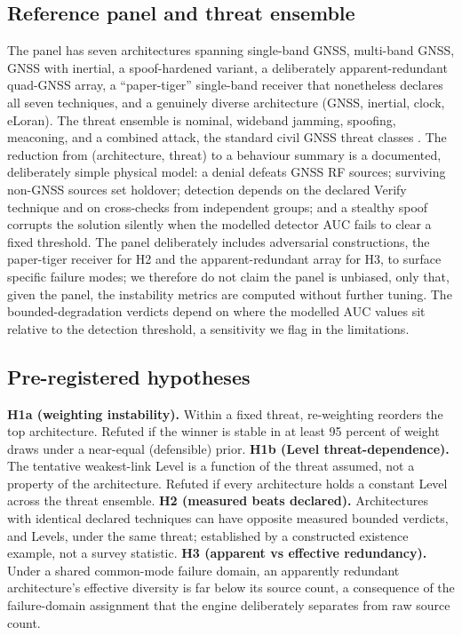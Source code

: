 \documentclass[conference]{IEEEtran}
\begin{document}
\subsection{Reference panel and threat ensemble}
The panel has seven architectures spanning single-band GNSS, multi-band GNSS, GNSS with inertial, a spoof-hardened variant, a deliberately apparent-redundant quad-GNSS array, a ``paper-tiger'' single-band receiver that nonetheless declares all seven techniques, and a genuinely diverse architecture (GNSS, inertial, clock, eLoran). The threat ensemble is nominal, wideband jamming, spoofing, meaconing, and a combined attack, the standard civil GNSS threat classes \cite{psiaki}. The reduction from (architecture, threat) to a behaviour summary is a documented, deliberately simple physical model: a denial defeats GNSS RF sources; surviving non-GNSS sources set holdover; detection depends on the declared Verify technique and on cross-checks from independent groups; and a stealthy spoof corrupts the solution silently when the modelled detector AUC fails to clear a fixed threshold. The panel deliberately includes adversarial constructions, the paper-tiger receiver for H2 and the apparent-redundant array for H3, to surface specific failure modes; we therefore do not claim the panel is unbiased, only that, given the panel, the instability metrics are computed without further tuning. The bounded-degradation verdicts depend on where the modelled AUC values sit relative to the detection threshold, a sensitivity we flag in the limitations.

\subsection{Pre-registered hypotheses}
\textbf{H1a (weighting instability).} Within a fixed threat, re-weighting reorders the top architecture. Refuted if the winner is stable in at least 95 percent of weight draws under a near-equal (defensible) prior. \textbf{H1b (Level threat-dependence).} The tentative weakest-link Level is a function of the threat assumed, not a property of the architecture. Refuted if every architecture holds a constant Level across the threat ensemble. \textbf{H2 (measured beats declared).} Architectures with identical declared techniques can have opposite measured bounded verdicts, and Levels, under the same threat; established by a constructed existence example, not a survey statistic. \textbf{H3 (apparent vs effective redundancy).} Under a shared common-mode failure domain, an apparently redundant architecture's effective diversity is far below its source count, a consequence of the failure-domain assignment that the engine deliberately separates from raw source count.
\end{document}
